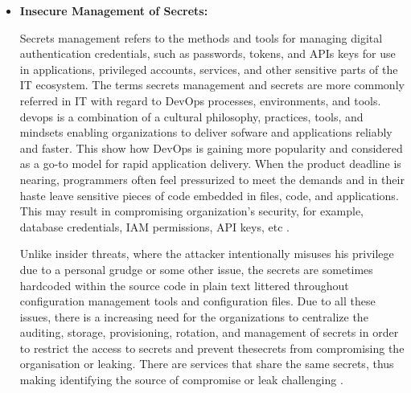 \begin{itemize}
    \item \textbf{Insecure Management of Secrets:} \par Secrets management refers to the methods and tools for managing digital authentication credentials, such as passwords, tokens, and APIs keys for use in applications, privileged accounts, services, and other sensitive parts of the IT ecosystem.
    The terms secrets management and secrets are more commonly referred in IT with regard to DevOps processes, environments, and tools.
    \gls{devops} is a combination of a cultural philosophy,
    practices, tools, and mindsets enabling organizations to deliver sofware and applications reliably and faster.
    This show how DevOps is gaining more popularity and considered as a go-to model for rapid application delivery.
    When the product deadline is nearing, programmers
    often feel pressurized to meet the demands and in
    their haste leave sensitive pieces of code embedded in files, code, and applications. This may result in compromising organization’s security, for example, database credentials, IAM permissions, API keys, etc \cite{70}.

    Unlike insider threats, where the attacker intentionally misuses his privilege due to a personal grudge or some
    other issue, the secrets are sometimes hardcoded
    within the source code in plain text littered throughout configuration management tools and configuration files.
    Due to all these issues, there is a increasing  need
    for the organizations to centralize the auditing,
    storage, provisioning, rotation, and management of secrets in order to restrict the access to secrets and prevent thesecrets from compromising the organisation or leaking. There are services that share the same secrets, thus making identifying the source of compromise or leak challenging \cite{70}.
\end{itemize}

